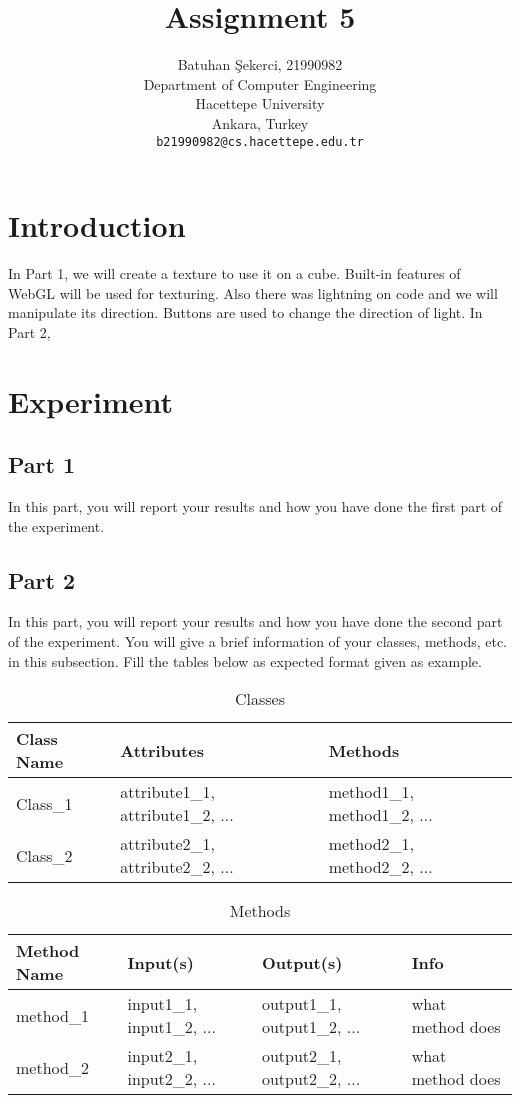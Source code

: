 \documentclass{article}
\title{Assignment 5}
\author{  
  Batuhan Şekerci, 21990982\\
  Department of Computer Engineering\\
  Hacettepe University\\
  Ankara, Turkey \\
  \texttt{b21990982@cs.hacettepe.edu.tr}
}
\begin{document}
\maketitle

\section{Introduction}
In Part 1, we will create a texture to use it on a cube. Built-in features of WebGL will be used for texturing. Also there was lightning on code and we will manipulate its direction. Buttons are used to change the direction of light.
In Part 2, 
\section{Experiment}

\subsection{Part 1}
In this part, you will report your results and how you have done the first part of the experiment.

\subsection{Part 2}
In this part, you will report your results and how you have done the second part of the experiment. You will give a brief information of your classes,  methods, etc. in this subsection. Fill the tables below as expected format given as example.

\begin{table}[!ht]
  \caption{Classes}
  \label{classes}
  \centering
  \begin{tabular}{lll}
    \toprule
    \cmidrule(r){1-3}
    Class Name & Attributes & Methods\\
    \midrule
    Class\_1 & attribute1\_1, attribute1\_2, ... & method1\_1, method1\_2, ...\\
    Class\_2 & attribute2\_1, attribute2\_2, ... & method2\_1, method2\_2, ...\\
    \bottomrule
  \end{tabular}
\end{table}

\begin{table}[!ht]
  \caption{Methods}
  \label{methods}
  \centering
  \begin{tabular}{llll}
    \toprule
    \cmidrule(r){1-4}
    Method Name & Input(s) & Output(s) & Info\\
    \midrule
    method\_1 & input1\_1, input1\_2, ... & output1\_1, output1\_2, ... & what method does\\
    method\_2 & input2\_1, input2\_2, ... & output2\_1, output2\_2, ... & what method does\\
    \bottomrule
  \end{tabular}
\end{table}
\end{document}
